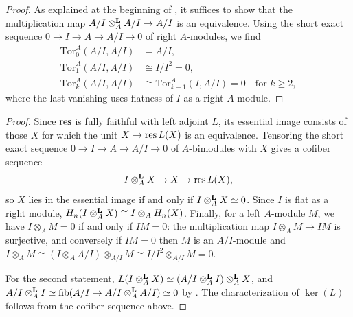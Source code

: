 	\begin{proof}
		As explained at the beginning of , it suffices to show that the multiplication map $A/I \otimes^{\mathbf{L}}_A A/I \to A/I$ is an equivalence. Using the short exact sequence $0 \to I \to A \to A/I \to 0$ of right $A$-modules, we find
		\begin{align*}
			\mathrm{Tor}^A_0(A/I,A/I) &= A/I, \\
			\mathrm{Tor}^A_1(A/I,A/I) &\cong I/I^2 = 0, \\
			\mathrm{Tor}^A_k(A/I,A/I) &\cong \mathrm{Tor}^A_{k-1}(I,A/I) = 0 \quad \text{for } k \geq 2,
		\end{align*}
		where the last vanishing uses flatness of $I$ as a right $A$-module.
	\end{proof}

	\begin{proof}
		Since $\operatorname{res}$ is fully faithful with left adjoint $L$, its essential image consists of those $X$ for which the unit $X \to \operatorname{res} L(X)$ is an equivalence. Tensoring the short exact sequence $0 \to I \to A \to A/I \to 0$ of $A$-bimodules with $X$ gives a cofiber sequence
		\[
			I \otimes^{\mathbf{L}}_A X \to X \to \operatorname{res} L(X),
		\]
		so $X$ lies in the essential image if and only if $I \otimes^{\mathbf{L}}_A X \simeq 0$. Since $I$ is flat as a right module, $H_n(I \otimes^{\mathbf{L}}_A X) \cong I \otimes_A H_n(X)$. Finally, for a left $A$-module $M$, we have $I \otimes_A M = 0$ if and only if $IM = 0$: the multiplication map $I \otimes_A M \to IM$ is surjective, and conversely if $IM = 0$ then $M$ is an $A/I$-module and $I \otimes_A M \cong (I \otimes_A A/I) \otimes_{A/I} M \cong I/I^2 \otimes_{A/I} M = 0$.

		For the second statement, $L(I \otimes^{\mathbf{L}}_A X) \simeq (A/I \otimes^{\mathbf{L}}_A I) \otimes^{\mathbf{L}}_A X$, and $A/I \otimes^{\mathbf{L}}_A I \simeq \operatorname{fib}(A/I \to A/I \otimes^{\mathbf{L}}_A A/I) \simeq 0$ by . The characterization of $\ker(L)$ follows from the cofiber sequence above.
	\end{proof}

